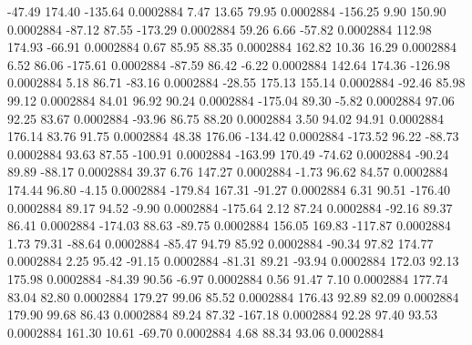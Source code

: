      -47.49      174.40     -135.64     0.0002884
        7.47       13.65       79.95     0.0002884
     -156.25        9.90      150.90     0.0002884
      -87.12       87.55     -173.29     0.0002884
       59.26        6.66      -57.82     0.0002884
      112.98      174.93      -66.91     0.0002884
        0.67       85.95       88.35     0.0002884
      162.82       10.36       16.29     0.0002884
        6.52       86.06     -175.61     0.0002884
      -87.59       86.42       -6.22     0.0002884
      142.64      174.36     -126.98     0.0002884
        5.18       86.71      -83.16     0.0002884
      -28.55      175.13      155.14     0.0002884
      -92.46       85.98       99.12     0.0002884
       84.01       96.92       90.24     0.0002884
     -175.04       89.30       -5.82     0.0002884
       97.06       92.25       83.67     0.0002884
      -93.96       86.75       88.20     0.0002884
        3.50       94.02       94.91     0.0002884
      176.14       83.76       91.75     0.0002884
       48.38      176.06     -134.42     0.0002884
     -173.52       96.22      -88.73     0.0002884
       93.63       87.55     -100.91     0.0002884
     -163.99      170.49      -74.62     0.0002884
      -90.24       89.89      -88.17     0.0002884
       39.37        6.76      147.27     0.0002884
       -1.73       96.62       84.57     0.0002884
      174.44       96.80       -4.15     0.0002884
     -179.84      167.31      -91.27     0.0002884
        6.31       90.51     -176.40     0.0002884
       89.17       94.52       -9.90     0.0002884
     -175.64        2.12       87.24     0.0002884
      -92.16       89.37       86.41     0.0002884
     -174.03       88.63      -89.75     0.0002884
      156.05      169.83     -117.87     0.0002884
        1.73       79.31      -88.64     0.0002884
      -85.47       94.79       85.92     0.0002884
      -90.34       97.82      174.77     0.0002884
        2.25       95.42      -91.15     0.0002884
      -81.31       89.21      -93.94     0.0002884
      172.03       92.13      175.98     0.0002884
      -84.39       90.56       -6.97     0.0002884
        0.56       91.47        7.10     0.0002884
      177.74       83.04       82.80     0.0002884
      179.27       99.06       85.52     0.0002884
      176.43       92.89       82.09     0.0002884
      179.90       99.68       86.43     0.0002884
       89.24       87.32     -167.18     0.0002884
       92.28       97.40       93.53     0.0002884
      161.30       10.61      -69.70     0.0002884
        4.68       88.34       93.06     0.0002884
